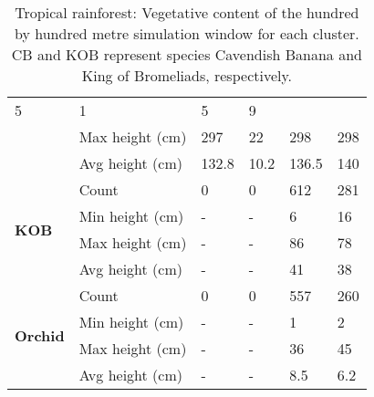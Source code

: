 \begin{table}[]
\begin{tabular}{|p{2cm}|p{2cm}|p{2cm}|p{2cm}|p{2cm}|p{2cm}|}
						\multicolumn{1}{l|}{5} & 
						\multicolumn{1}{l|}{1} &
						\multicolumn{1}{l|}{5} & 
						\multicolumn{1}{l|}{9} \\\cline{2-6} &
						\multicolumn{1}{l|}{Max height (cm)} & 
						\multicolumn{1}{l|}{297} & 
						\multicolumn{1}{l|}{22} &
						\multicolumn{1}{l|}{298} & 
						\multicolumn{1}{l|}{298} \\\cline{2-6} &
						\multicolumn{1}{l|}{Avg height (cm)} & 
						\multicolumn{1}{l|}{132.8} & 
						\multicolumn{1}{l|}{10.2} &
						\multicolumn{1}{l|}{136.5} & 
						\multicolumn{1}{l|}{140} \\\cline{2-6}
		\hline      
		\multirow{4}{*}{\textbf{KOB}} & 
						\multicolumn{1}{l|}{Count} & 
						\multicolumn{1}{l|}{0} & 
						\multicolumn{1}{l|}{0} &
						\multicolumn{1}{l|}{612} & 
						\multicolumn{1}{l|}{281} \\\cline{2-6} &
						\multicolumn{1}{l|}{Min height (cm)} & 
						\multicolumn{1}{l|}{-} & 
						\multicolumn{1}{l|}{-} &
						\multicolumn{1}{l|}{6} & 
						\multicolumn{1}{l|}{16} \\\cline{2-6} &
						\multicolumn{1}{l|}{Max height (cm)} & 
						\multicolumn{1}{l|}{-} & 
						\multicolumn{1}{l|}{-} &
						\multicolumn{1}{l|}{86} & 
						\multicolumn{1}{l|}{78} \\\cline{2-6} &
						\multicolumn{1}{l|}{Avg height (cm)} & 
						\multicolumn{1}{l|}{-} & 
						\multicolumn{1}{l|}{-} &
						\multicolumn{1}{l|}{41} & 
						\multicolumn{1}{l|}{38} \\\cline{2-6}
		\hline     
		\multirow{4}{*}{\textbf{Orchid}} & 
						\multicolumn{1}{l|}{Count} & 
						\multicolumn{1}{l|}{0} & 
						\multicolumn{1}{l|}{0} &
						\multicolumn{1}{l|}{557} & 
						\multicolumn{1}{l|}{260} \\\cline{2-6} &
						\multicolumn{1}{l|}{Min height (cm)} & 
						\multicolumn{1}{l|}{-} & 
						\multicolumn{1}{l|}{-} &
						\multicolumn{1}{l|}{1} & 
						\multicolumn{1}{l|}{2} \\\cline{2-6} &
						\multicolumn{1}{l|}{Max height (cm)} & 
						\multicolumn{1}{l|}{-} & 
						\multicolumn{1}{l|}{-} &
						\multicolumn{1}{l|}{36} & 
						\multicolumn{1}{l|}{45} \\\cline{2-6} &
						\multicolumn{1}{l|}{Avg height (cm)} & 
						\multicolumn{1}{l|}{-} & 
						\multicolumn{1}{l|}{-} &
						\multicolumn{1}{l|}{8.5} & 
						\multicolumn{1}{l|}{6.2} \\\cline{2-6}
		\hline                                                       
		\end{tabular}
	\label{tab:results_tropical_species_cluster_properties}	
	\caption{Tropical rainforest: Vegetative content of the hundred by hundred metre simulation window for each cluster. CB and KOB represent species Cavendish Banana and King of Bromeliads, respectively.}
\end{table}

